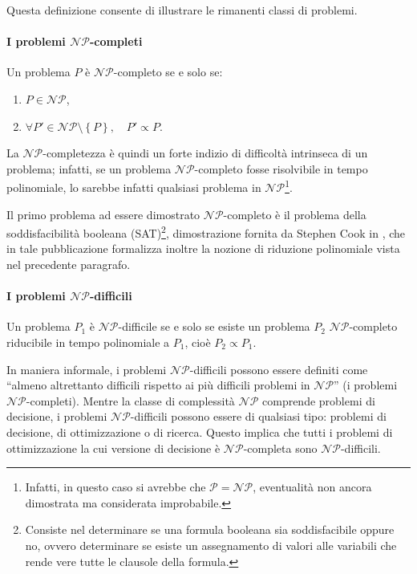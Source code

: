 Questa definizione consente di illustrare le rimanenti classi di problemi.

\paragraph{I problemi $\mathcal{NP}$-completi}
\begin{mydef}
 Un problema $P$ è $\mathcal{NP}$-completo se e solo se:
 \begin{enumerate}
  \item $P \in \mathcal{NP}$,
  \item $\forall P' \in \mathcal{NP} \setminus \left\{P\right\}, \quad P' \propto P$.
 \end{enumerate}
\end{mydef}
La $\mathcal{NP}$-completezza è quindi un forte indizio di difficoltà intrinseca di un 
problema; infatti, se un problema $\mathcal{NP}$-completo fosse risolvibile in tempo 
polinomiale, lo sarebbe infatti qualsiasi problema in $\mathcal{NP}$\footnote{Infatti, in 
questo caso si avrebbe che $\mathcal{P} = \mathcal{NP}$, eventualità non ancora 
dimostrata ma considerata improbabile.}.

Il primo problema ad essere dimostrato $\mathcal{NP}$-completo è il problema della 
soddisfacibilità booleana (SAT)\footnote{Consiste nel determinare se una formula booleana 
sia soddisfacibile oppure no, ovvero determinare se esiste un assegnamento di valori alle 
variabili che rende vere tutte le clausole della formula.}, dimostrazione fornita da 
Stephen Cook in \cite{CookSAT}, che in tale pubblicazione formalizza inoltre la nozione 
di riduzione polinomiale vista nel precedente paragrafo.

\paragraph{I problemi $\mathcal{NP}$-difficili}
\begin{mydef}
 Un problema $P_1$ è $\mathcal{NP}$-difficile se e solo se esiste un problema $P_2$ 
$\mathcal{NP}$-completo riducibile in tempo polinomiale a $P_1$, cioè 
$P_2 \propto P_1$.
\end{mydef}
In maniera informale, i problemi $\mathcal{NP}$-difficili possono essere definiti come 
``almeno altrettanto difficili rispetto ai più difficili problemi in $\mathcal{NP}$'' (i 
problemi $\mathcal{NP}$-completi). Mentre la classe di complessità $\mathcal{NP}$ 
comprende problemi di decisione, i problemi $\mathcal{NP}$-difficili possono essere 
di qualsiasi tipo: problemi di decisione, di ottimizzazione o di ricerca. Questo 
implica che tutti i problemi di ottimizzazione la cui versione di decisione è 
\mbox{$\mathcal{NP}$-completa} sono $\mathcal{NP}$-difficili.
